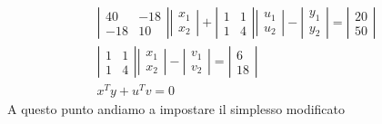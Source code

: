 \documentclass[12pt,a4paper]{article}
\begin{document}
\begin{equation*}\begin{array}{l}
\left|\begin{array}{cc} 40 & -18\\ -18 & 10\end{array}\right|\left|\begin{array}{c} x_1\\x_2\end{array}\right| + \left|\begin{array}{cc} 1 & 1\\ 1& 4\end{array}\right|\left|\begin{array}{c} u_1\\u_2\end{array}\right| - \left|\begin{array}{c} y_1\\y_2\end{array}\right| = \left|\begin{array}{c} 20\\50\end{array}\right|\\
\left|\begin{array}{cc} 1 & 1\\ 1& 4\end{array}\right|\left|\begin{array}{c} x_1\\x_2\end{array}\right| - \left|\begin{array}{c} v_1\\v_2\end{array}\right| = \left|\begin{array}{c} 6\\18\end{array}\right|\\
x^Ty+u^Tv = 0
\end{array} \end{equation*}
A questo punto andiamo a impostare il simplesso modificato
\begin{Parallel}{0.45 \textwidth}{0.45 \textwidth}
\end{Parallel}



\end{document}
